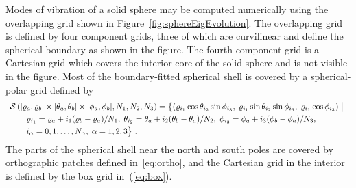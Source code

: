 Modes of vibration of a solid sphere may be computed numerically using the overlapping grid shown in Figure~\ref{fig:sphereEigEvolution}.  The overlapping grid is defined by four component grids, three of which are curvilinear and define the spherical boundary as shown in the figure.  The fourth component grid is a Cartesian grid which covers the interior core of the solid sphere and is not visible in the figure.  Most of the boundary-fitted spherical shell is covered by a spherical-polar grid defined by
\begin{equation}
\begin{array}{l}
\displaystyle{
  \SphereGrid\left([\rad_a,\rad_b]\times[\theta_a,\theta_b]\times[\phi_a,\phi_b],N_1,N_2,N_3\right) = 
        \big\{ ( \rad_{i_1}\cos\theta_{i_2}\sin\phi_{i_3},\; \rad_{i_1}\sin\theta_{i_2}\sin\phi_{i_3},\; \rad_{i_1}\cos\phi_{i_3})\;\big\vert\;}\smallskip\\
\qquad\displaystyle{
  \rad_{i_1}=\rad_a+i_1(\rad_b-\rad_a)/N_1,\; \theta_{i_2}=\theta_a+i_2(\theta_b-\theta_a)/N_2,\; \phi_{i_3}=\phi_a+i_3(\phi_b-\phi_a)/N_3,} \smallskip\\
\qquad\displaystyle{
              i_\alpha=0,1,\ldots,N_\alpha,\;\alpha=1,2,3\big\}~.}
\end{array}
\label{eq:sphere}
\end{equation}
The parts of the spherical shell near the north and south poles are covered by orthographic patches defined in~\eqref{eq:ortho}, and the Cartesian grid in the interior is defined by the box grid in~(\ref{eq:box}).
